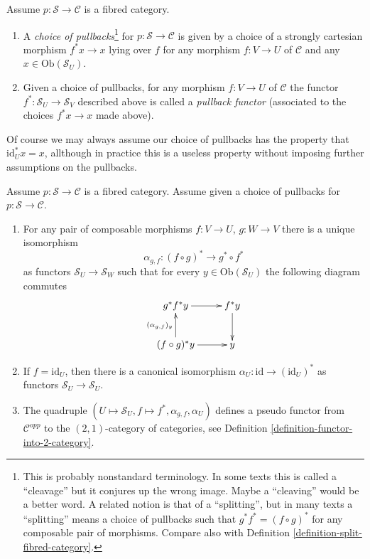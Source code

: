 \begin{definition}
\label{definition-pullback-functor-fibred-category}
Assume $p : \mathcal{S} \to \mathcal{C}$ is a fibred category.
\begin{enumerate}
\item A {\it choice of pullbacks}\footnote{This is probably nonstandard
terminology. In some texts this is called a ``cleavage''  but it conjures up
the wrong image. Maybe a ``cleaving'' would be a better word.
A related notion is that of a ``splitting'', but in many texts a ``splitting''
means a choice of pullbacks such that $g^*f^* = (f \circ g)^*$
for any composable pair of morphisms. Compare
also with Definition \ref{definition-split-fibred-category}.}
for $p : \mathcal{S} \to \mathcal{C}$
is given by a choice of a strongly cartesian morphism
$f^\ast x \to x$ lying over $f$ for any morphism
$f: V \to U$ of $\mathcal{C}$ and any $x \in \text{Ob}(\mathcal{S}_U)$.
\item Given a choice of pullbacks,
for any morphism $f : V \to U$ of $\mathcal{C}$
the functor $f^* : \mathcal{S}_U \to \mathcal{S}_V$ described
above is called a {\it pullback functor} (associated to the choices
$f^*x \to x$ made above).
\end{enumerate}
\end{definition}

\noindent
Of course we may always assume our choice of pullbacks has the property that
$\text{id}_U^*x = x$, allthough in practice this is a useless property
without imposing further assumptions on the pullbacks.

\begin{lemma}
\label{lemma-fibred}
Assume $p : \mathcal{S} \to \mathcal{C}$ is a fibred category.
Assume given a choice of pullbacks for $p : \mathcal{S} \to \mathcal{C}$.
\begin{enumerate}
\item For any pair of composable morphisms $f : V \to U$,
$g : W \to V$ there is a unique isomorphism
$$
\alpha_{g, f} :
(f \circ g)^\ast
\longrightarrow
g^\ast \circ f^\ast
$$
as functors $\mathcal{S}_U \to \mathcal{S}_W$
such that for every $y\in \text{Ob}(\mathcal{S}_U)$ the following
diagram commutes
$$
\xymatrix{
g^\ast f^\ast y \ar[r]
&
f^\ast y \ar[d] \\
(f \circ g)^\ast y \ar[r]
\ar[u]^{(\alpha_{g, f})_y}
&
y
}
$$
\item If $f = \text{id}_U$, then there is a canonical isomorphism
$\alpha_U : \text{id} \to (\text{id}_U)^*$ as functors
$\mathcal{S}_U \to \mathcal{S}_U$.
\item The quadruple
$(U \mapsto \mathcal{S}_U, f \mapsto f^*, \alpha_{g, f}, \alpha_U)$
defines a pseudo functor from $\mathcal{C}^{opp}$ to
the $(2, 1)$-category of categories, see
Definition \ref{definition-functor-into-2-category}.
\end{enumerate}
\end{lemma}

